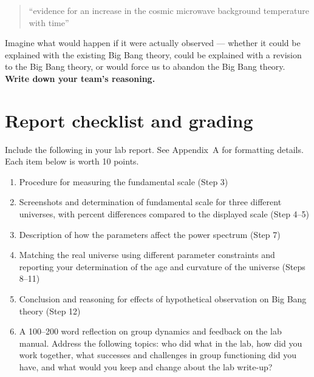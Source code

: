 \begin{quote}
	``evidence for an increase in the cosmic microwave background temperature with time''
\end{quote}

\begin{steps}
	\item Imagine what would happen if it were actually observed --- whether it could be explained with the existing Big Bang theory, could be explained with a revision to the Big Bang theory, or would force us to abandon the Big Bang theory. \textbf{Write down your team's reasoning.}

\end{steps}

\section{Report checklist and grading}

Include the following in your lab report. See Appendix~A for formatting details. Each item below is worth 10 points.

\begin{enumerate}
%	
	
	\item Procedure for measuring the fundamental scale (Step 3)
	
	\item Screenshots and determination of fundamental scale for three different universes, with percent differences compared to the displayed scale (Step 4--5)
	
	\item Description of how the parameters affect the power spectrum (Step 7)
	
	\item Matching the real universe using different parameter constraints and reporting your determination of the age and curvature of the universe (Steps 8--11)

	\item Conclusion and reasoning for effects of hypothetical observation on Big Bang theory (Step 12)
	
	\item A 100--200 word reflection on group dynamics and feedback on the lab manual. Address the following topics: who did what in the lab, how did you work together, what successes and challenges in group functioning did you have, and what would you keep and change about the lab write-up?
\end{enumerate}
